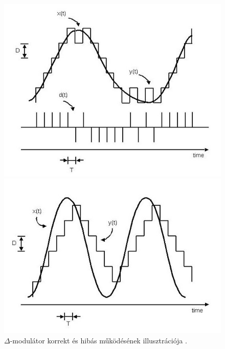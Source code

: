 \documentclass[12pt]{article}
\theoremstyle{plain}
\begin{document}
\begin{figure}[]
	\centering
	\begin{minipage}{0.47\textwidth}
		\centering
		\includegraphics[width=1.0\textwidth]{./media/delta_modulation_correct.png}
	\end{minipage}\hfill
	\begin{minipage}{0.53\textwidth}
		\centering
		\includegraphics[width=1\textwidth]{./media/delta_modulation_incorrect.png}
	\end{minipage}
	\caption{$\Delta$-modulátor korrekt és hibás működésének illusztrációja \cite{quora}.}
	\label{fig:deltamodulation}
\end{figure}
\end{document}
